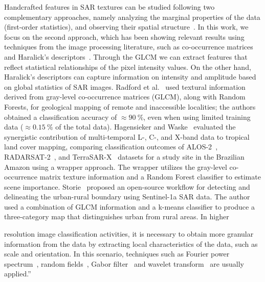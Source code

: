 \documentclass[journal,onecolumn,draftcls,11pt]{IEEEtran}
\begin{document}
\begin{tcolorbox}[colback=white,colframe=black,title=Change \#4]
    Handcrafted features in SAR textures can be studied following two complementary approaches, namely analyzing the marginal properties of the data (first-order statistics), and observing their spatial structure~\cite{Yue2020Gaussian, numbisi2018multi}.
    In this work, we focus on the second approach, which has been showing relevant results using techniques from the image processing literature, such as co-occurrence matrices and Haralick's descriptors~\cite{yu2019detection}.
    Through the GLCM we can extract features that reflect statistical relationships of the pixel intensity values.
    On the other hand, Haralick's descriptors can capture information on intensity and amplitude based on global statistics of SAR images.
    Radford et al.~\cite{radford2018geological} used textural information derived from gray-level co-occurrence matrices (GLCM), along with Random Forests, for geological mapping of remote and inaccessible localities; the authors obtained a classification accuracy of $\approx\SI{90}{\percent}$, even when using limited training data ($\approx\SI{0.15}{\percent}$ of the total data). 
    Hagensieker and Waske~\cite{hagensieker2018evaluation} evaluated the synergistic contribution of multi-temporal L-, C-, and X-band data to tropical land cover mapping, comparing classification outcomes of ALOS-2~\cite{kankaku2013alos}, RADARSAT-2~\cite{morena2004introduction}, and TerraSAR-X~\cite{breit2009terrasar} datasets for a study site in the Brazilian Amazon using a wrapper approach. 
    The wrapper utilizes the gray-level co-occurrence matrix texture information and a  Random Forest classifier to estimate scene importance. 	
    Storie~\cite{storie2018urban} proposed an open-source workflow for detecting and delineating the urban-rural boundary using Sentinel-1a SAR data.
    The author used a combination of GLCM information and a k-means classifier to produce a three-category map that distinguishes urban from rural areas. In higher 
\end{tcolorbox}
\begin{tcolorbox}[colback=white,colframe=black,title=Change \#4]
    resolution image classification activities, it is necessary to obtain more granular information from the data by extracting local characteristics of the data, such as scale and orientation.
    In this scenario, techniques such as Fourier power spectrum~\cite{Florindo2012Fractal}, random fields~\cite{zhu2016antarctic}, Gabor filter~\cite{dumitru2014information} and wavelet transform~\cite{akbarizadeh2012new} are usually applied.''
\end{tcolorbox}
\end{document}
